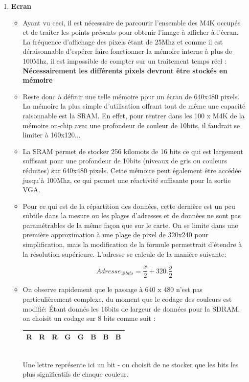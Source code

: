 \documentclass[10pt,a4paper]{report}
\begin{document}
\begin{enumerate}
\item \textbf{Ecran}
\begin{itemize}
\item Ayant vu ceci, il est nécessaire de parcourir l'ensemble des M4K occupés et de traiter les points présents pour obtenir l'image à afficher à l'écran. La fréquence d'affichage des pixels étant de 25Mhz et comme il est déraisonnable d'espérer faire fonctionner la mémoire interne à plus de 100Mhz, il est impossible de compter sur un traitement temps réel : \textbf{Nécessairement les différents pixels devront être stockés en mémoire}

\item Reste donc à définir une telle mémoire pour un écran de 640x480 pixels. La mémoire la plus simple d'utilisation offrant tout de même une capacité raisonnable est la SRAM. En effet, pour rentrer dans les 100 x M4K de la mémoire on-chip avec une profondeur de couleur de 10bits, il faudrait se limiter à 160x120...

\item La SRAM permet de stocker 256 kilomots de 16 bits ce qui est largement suffisant pour une profondeur de 10bits (niveaux de gris ou couleurs réduites) sur 640x480 pixels. Cette mémoire peut également être accédée jusqu'à 100Mhz, ce qui permet une réactivité suffisante pour la sortie VGA.

\item Pour ce qui est de la répartition des données, cette dernière est un peu subtile dans la mesure ou les plages d'adresses et de données ne sont pas paramétrables de la même façon que sur le carte. On se limite dans une première approximation à une plage de pixel de 320x240 pour simplification, mais la modification de la formule permettrait d'étendre à la résolution supérieure. L'adresse se calcule de la manière suivante:

\[ Adresse_{18bits} = \frac{x}{2} + 320 . \frac{y}{2} \]

\item On observe rapidement que le passage à 640 x 480 n'est pas particulièrement complexe, du moment que le codage des couleurs est modifié: Étant donnés les 16bits de largeur de données pour la SDRAM, on choisit un codage sur 8 bits comme suit :

\begin{center}
\begin{tabular}{|c|c|c|c|c|c|c|c|}
\hline 
R & R & R & G & G & B & B & B \\ 
\hline 
\end{tabular}
\\ Une lettre représente ici un bit - on choisit de ne stocker que les bits les plus significatifs de chaque couleur.
\end{center}


\end{itemize}
\end{enumerate}
\end{document}
